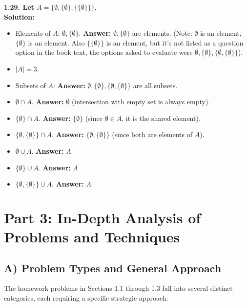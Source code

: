 \documentclass[12pt]{article}
\begin{document}
\vspace{0.5cm}
\textbf{1.29. Let $A = \{\emptyset, \{\emptyset\}, \{\{\emptyset\}\}\}$.} \\
\textbf{Solution:}
\begin{itemize}
    \item[(a)] Elements of $A$: $\emptyset, \{\emptyset\}$. \textbf{Answer:} $\emptyset, \{\emptyset\}$ are elements. (Note: $\emptyset$ is an element, $\{\emptyset\}$ is an element. Also $\{\{\emptyset\}\}$ is an element, but it's not listed as a question option in the book text, the options asked to evaluate were $\emptyset, \{\emptyset\}, \{\emptyset, \{\emptyset\}\}$).
    \item[(b)] $|A| = 3$.
    \item[(c)] Subsets of $A$: \textbf{Answer:} $\emptyset, \{\emptyset\}, \{\emptyset, \{\emptyset\}\}$ are all subsets.
    \item[(d)] $\emptyset \cap A$. \textbf{Answer:} $\emptyset$ (intersection with empty set is always empty).
    \item[(e)] $\{\emptyset\} \cap A$. \textbf{Answer:} $\{\emptyset\}$ (since $\emptyset \in A$, it is the shared element).
    \item[(f)] $\{\emptyset, \{\emptyset\}\} \cap A$. \textbf{Answer:} $\{\emptyset, \{\emptyset\}\}$ (since both are elements of $A$).
    \item[(g)] $\emptyset \cup A$. \textbf{Answer:} $A$
    \item[(h)] $\{\emptyset\} \cup A$. \textbf{Answer:} $A$
    \item[(i)] $\{\emptyset, \{\emptyset\}\} \cup A$. \textbf{Answer:} $A$
\end{itemize}

\newpage
\section{Part 3: In-Depth Analysis of Problems and Techniques}

\subsection{A) Problem Types and General Approach}
The homework problems in Sections 1.1 through 1.3 fall into several distinct categories, each requiring a specific strategic approach:
\end{document}
